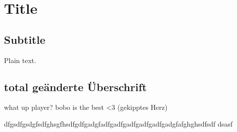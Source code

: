 \documentclass{article}
\begin{document}
\section{Title}

\subsection{Subtitle}

Plain text.

\subsection{total geänderte Überschrift}

what up player?
bobo is the best <3 (gekipptes Herz)

dfgsdfgsdgfsdfghsgfhsdfgdfgadgfadfgadfgadfgadfgadfgadgfafghghsdfsdf
dsasf
\end{document}
